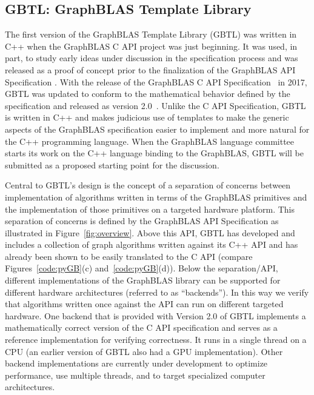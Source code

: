 \subsection{GBTL: GraphBLAS Template Library}
 
The first version of the GraphBLAS Template Library (GBTL) was written in C++ 
when the GraphBLAS C API project was just beginning.  It was used, in part, 
to study early ideas under discussion in the specification process and was released as a proof of concept 
prior to the finalization of the GraphBLAS API Specification \cite{gbtl-cuda16, McMillan2016}. With the 
release of the GraphBLAS C API Specification~\cite{cspec} in 2017, GBTL was updated to conform to 
the mathematical behavior defined by the specification and released as version 2.0~\cite{gbtl-github}.  
Unlike the C API Specification, GBTL is written in C++ and makes judicious use of templates to 
make the generic aspects of the GraphBLAS specification easier to implement and 
more natural for the C++ programming language. When the GraphBLAS language committee
starts its work on the C++ language binding to the GraphBLAS, GBTL will be submitted as a 
proposed starting point for the discussion.

 
Central to GBTL's design is the concept of a separation of concerns between 
implementation of algorithms written in terms of the GraphBLAS primitives  
and the implementation of those primitives on a targeted hardware platform.   
This separation of concerns is defined by the GraphBLAS API Specification as
illustrated in Figure~\ref{fig:overview}.  
Above this API, GBTL has developed and includes a collection of graph algorithms 
written against its C++ API and has already been shown to be easily translated to 
the C API (compare Figures~\ref{code:pyGB}(c) and~\ref{code:pyGB}(d)).  Below the separation/API, different implementations of the GraphBLAS 
library can be supported for different hardware architectures (referred to as 
``backends'').  In this way we verify that algorithms written once against the API 
can run on different targeted hardware.  One backend that is provided with Version 
2.0 of GBTL implements a mathematically correct version of the C API 
specification and serves as a reference implementation for verifying correctness.  It runs 
in a single thread on a CPU (an earlier version of GBTL also had a GPU 
implementation).  Other backend implementations are currently under development 
to optimize performance, use multiple threads, and to target specialized 
computer architectures.

